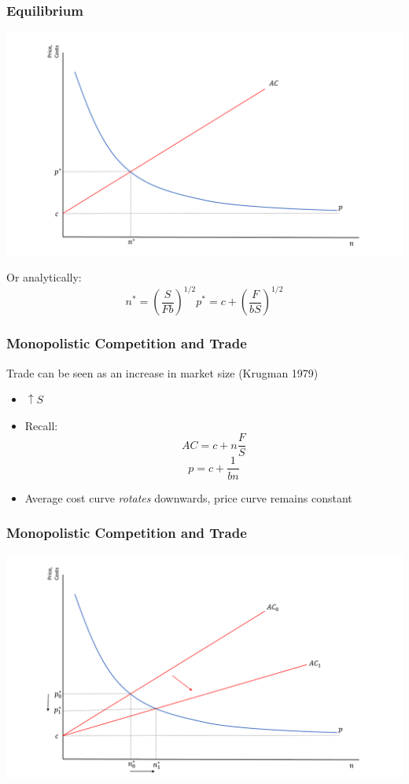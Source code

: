 \documentclass{beamer}
\begin{document}
\begin{frame}
\frametitle{Equilibrium}
\includegraphics[scale=0.3]{SL2_7.pdf}

\scriptsize
Or analytically:
	\begin{equation}
	n^* =\left(\frac{S}{Fb}\right)^{1/2} \nonumber
	p^*=c + \left(\frac{F}{bS}\right)^{1/2}
	\end{equation}


\end{frame}

\begin{frame}
\frametitle{Monopolistic Competition and Trade}
Trade can be seen as an increase in market size (Krugman 1979)
\begin{itemize}
	\item $\uparrow S$
	\item Recall:
				$$AC=c+n\frac{F}{S}$$
				$$p=c+\frac{1}{bn}$$
	\item Average cost curve \emph{rotates} downwards, price curve remains constant
\end{itemize}

\end{frame}

\begin{frame}
	\frametitle{Monopolistic Competition and Trade}
	\includegraphics[scale=0.32]{SL2_8.pdf}
\end{frame}
\end{document}

